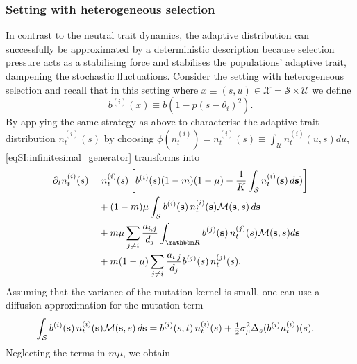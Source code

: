 \subsubsection{Setting with heterogeneous selection}\label{sec:anal_sett_2}
In contrast to the neutral trait dynamics, the adaptive distribution can successfully be approximated by a deterministic description because selection pressure acts as a stabilising force and stabilises the populations' adaptive trait, dampening the stochastic fluctuations.
%
Consider the setting with heterogeneous selection and recall that in this setting where $x \equiv (s,u) \in \mathcal{X} = \mathcal{S} \times \mathcal{U}$ we define
\begin{equation}\label{eqSI:b_d_sett2}
  b^{(i)}(x) \equiv b(1-p(s-\theta_i)^2).
\end{equation}
%
By applying the same strategy as above to characterise the adaptive trait distribution $n^{(i)}_t(s)$ by choosing $\phi(n^{(i)}_t) = n^{(i)}_t(s) \equiv \int_\mathcal{U} n^{(i)}_t(u,s) du $, \cref{eqSI:infinitesimal_generator} transforms into
%
\begin{equation}\label{eqSI:general_equation}
    \begin{split}
    \partial_t n_t^{(i)}(s) &= n_t^{(i)}(s)\left[b^{(i)}(s)(1-m)(1-\mu) - \frac{1}{K}\int_\mathcal{S} n_t^{(i)}({\textbf s}) \, d {\textbf s})\right] \\
    &\quad + (1- m)\mu \int_\mathcal{S} b^{(i)}({\textbf s}) \, n_t^{(i)}( {\textbf s})  \mathcal{M}({\textbf s}, s) \, d{\textbf s} \\
    &\quad + m \mu \sum_{j\neq i}\frac{a_{i,j}}{d_j}  \int_\R b^{(j)}({\textbf s}) \,  n_t^{(j)}(s) \mathcal{M}({\textbf s}, s) d{\textbf s}\\
    &\quad + m (1 - \mu) \sum_{j\neq i}\frac{a_{i,j}}{d_j}  b^{(j)}(s) \, n_t^{(j)}(s).
  \end{split}
\end{equation}
%
Assuming that the variance of the mutation kernel is small, one can use a diffusion approximation for the mutation term \cite{Kimura1965,Debarre2013,Mirrahimi2020}
\begin{equation}
  \begin{split}
  \int_\mathcal{S} b^{(i)}({\textbf s}) \, n_t^{(i)}({\textbf s}) \mathcal{M}({\textbf s}, s) \, d{\textbf s} 
          &= b^{(i)}(s,t) \, n_t^{(i)}(s) + \tfrac{1}{2} \sigma_\mu^2 \Delta_s ( b^{(i)} n_t^{(i)})(s) .
  \end{split}
\end{equation}
%
Neglecting the terms in $m \mu$, we obtain
